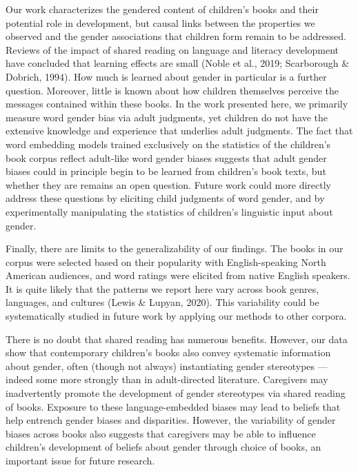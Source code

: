 \documentclass[
  english,
  ,man,floatsintext]{apa6}
\begin{document}
Our work characterizes the gendered content of children's books and their potential role in development, but causal links between the properties we observed and the gender associations that children form remain to be addressed. Reviews of the impact of shared reading on language and literacy development have concluded that learning effects are small (Noble et al., 2019; Scarborough \& Dobrich, 1994). How much is learned about gender in particular is a further question. Moreover, little is known about how children themselves perceive the messages contained within these books. In the work presented here, we primarily measure word gender bias via adult judgments, yet children do not have the extensive knowledge and experience that underlies adult judgments. The fact that word embedding models trained exclusively on the statistics of the children's book corpus reflect adult-like word gender biases suggests that adult gender biases could in principle begin to be learned from children's book texts, but whether they are remains an open question. Future work could more directly address these questions by eliciting child judgments of word gender, and by experimentally manipulating the statistics of children's linguistic input about gender.

Finally, there are limits to the generalizability of our findings. The books in our corpus were selected based on their popularity with English-speaking North American audiences, and word ratings were elicited from native English speakers. It is quite likely that the patterns we report here vary across book genres, languages, and cultures (Lewis \& Lupyan, 2020). This variability could be systematically studied in future work by applying our methods to other corpora.

There is no doubt that shared reading has numerous benefits. However, our data show that contemporary children's books also convey systematic information about gender, often (though not always) instantiating gender stereotypes --- indeed some more strongly than in adult-directed literature. Caregivers may inadvertently promote the development of gender stereotypes via shared reading of books. Exposure to these language-embedded biases may lead to beliefs that help entrench gender biases and disparities. However, the variability of gender biases across books also suggests that caregivers may be able to influence children's development of beliefs about gender through choice of books, an important issue for future research.

\newpage
\end{document}
